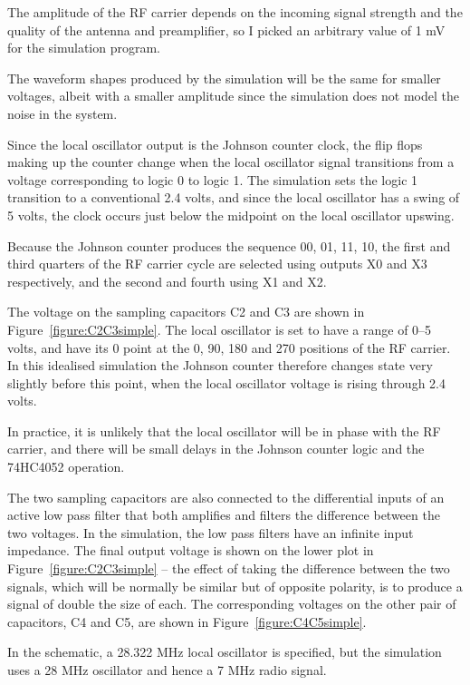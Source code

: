 \documentclass[11pt, twoside]{article}
\begin{document}
The amplitude of the RF carrier depends on the incoming signal
strength and the quality of the antenna and preamplifier, so I picked
an arbitrary value of 1 mV for the simulation program.

The waveform shapes produced by the simulation will be the same for
smaller voltages, albeit with a smaller amplitude since the simulation
does not model the noise in the system.

Since the local oscillator output is the Johnson counter clock, the
flip flops making up the counter change when the local oscillator
signal transitions from a voltage corresponding to logic 0 to logic 1.
The simulation sets the logic 1 transition to a conventional 2.4
volts, and since the local oscillator has a swing of 5 volts, the
clock occurs just below the midpoint on the local oscillator upswing.

Because the Johnson counter produces the sequence 00, 01, 11, 10, the
first and third quarters of the RF carrier cycle are selected using
outputs X0 and X3 respectively, and the second and fourth using X1 and
X2.

The voltage on the sampling capacitors C2 and C3 are shown in
Figure~\ref{figure:C2C3simple}. The local oscillator is set to have a
range of 0--5 volts, and have its 0{\degree} point at the 0{\degree},
90{\degree}, 180{\degree} and 270{\degree} positions of the RF
carrier.  In this idealised simulation the Johnson counter therefore
changes state very slightly before this point, when the local
oscillator voltage is rising through 2.4 volts.

In practice, it is unlikely that the local oscillator will be in phase
with the RF carrier, and there will be small delays in the Johnson
counter logic and the 74HC4052 operation.

The two sampling capacitors are also connected to the differential
inputs of an active low pass filter that both amplifies and filters
the difference between the two voltages.  In the simulation, the low
pass filters have an infinite input impedance. The final output
voltage is shown on the lower plot in Figure~\ref{figure:C2C3simple}
-- the effect of taking the difference between the two signals, which
will be normally be similar but of opposite polarity, is to produce a
signal of double the size of each.  The corresponding voltages on the
other pair of capacitors, C4 and C5, are shown in
Figure~\ref{figure:C4C5simple}.

In the \cite{ly1gp:2007} schematic, a 28.322 MHz local oscillator is
specified, but the simulation uses a 28 MHz oscillator and hence a 7
MHz radio signal.
\end{document}
